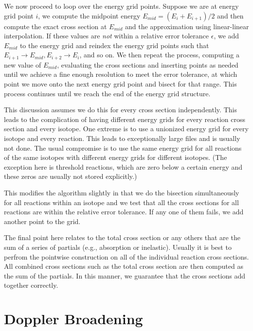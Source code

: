 We now proceed to loop over the energy grid points. Suppose we are at energy grid point $i$, we compute the midpoint energy $E_{mid} = (E_i + E_{i+1} )/2$ and then compute the exact cross section at $E_{mid}$ and the approximation using linear-linear interpolation. If these values are \emph{not} within a relative error tolerance $\epsilon$, we add $E_{mid}$ to the energy grid and reindex the energy grid points such that $E_{i+1} \rightarrow E_{mid}, E_{i+2} \rightarrow E_i$, and so on. We then repeat the process, computing a new value of $E_{mid}$, evaluating the cross sections and inserting points as needed until we achieve a fine enough resolution to meet the error tolerance, at which point we move onto the next energy grid point and bisect for that range. This process continues until we reach the end of the energy grid structure.

This discussion assumes we do this for every cross section independently. This leads to the complication of having different energy grids for every reaction cross section and every isotope. One extreme is to use a unionized energy grid for every isotope and every reaction. This leads to exceptionally large files and is usually not done. The usual compromise is to use the same energy grid for all reactions of the same isotopes with different energy grids for different isotopes. (The exception here is threshold reactions, which are zero below a certain energy and these zeros are usually not stored explicitly.)

This modifies the algorithm slightly in that we do the bisection simultaneously for all reactions within an isotope and we test that all the cross sections for all reactions are within the relative error tolerance. If any one of them fails, we add another point to the grid.

The final point here relates to the total cross section or any others that are the sum of a series of partials (e.g., absorption or inelastic). Usually it is best to perfrom the pointwise construction on all of the individual reaction cross sections. All combined cross sections such as the total cross section are then computed as the sum of the partials. In this manner, we guarantee that the cross sections add together correctly.

\section{Doppler Broadening}

